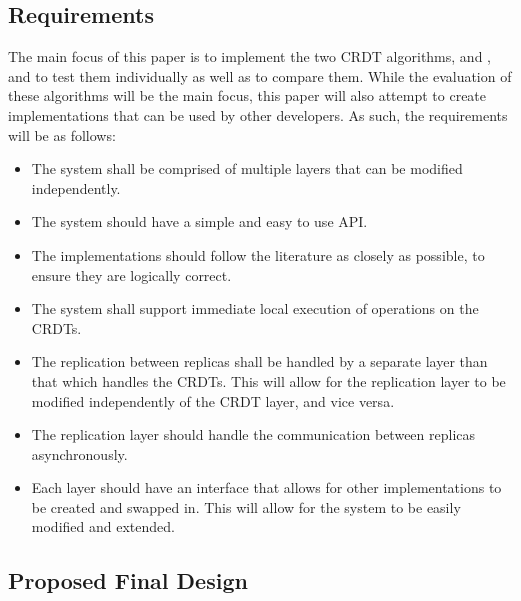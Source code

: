 \documentclass[12pt]{article}
\begin{document}
\subsection{Requirements}
The main focus of this paper is to implement the two CRDT algorithms, \cite{9563274} and \cite{https://doi.org/10.48550/arxiv.2103.04828}, and to test them individually as well as to compare them. While the evaluation of these algorithms will be the main focus, this paper will also attempt to create implementations that can be used by other developers. As such, the requirements will be as follows:
\begin{itemize}
    \item The system shall be comprised of multiple layers that can be modified independently.
    \item The system should have a simple and easy to use API.
    \item The implementations should follow the literature as closely as possible, to ensure they are logically correct.
    \item The system shall support immediate local execution of operations on the CRDTs.
    \item The replication between replicas shall be handled by a separate layer than that which handles the CRDTs. This will allow for the replication layer to be modified independently of the CRDT layer, and vice versa.
    \item The replication layer should handle the communication between replicas asynchronously.
    \item Each layer should have an interface that allows for other implementations to be created and swapped in. This will allow for the system to be easily modified and extended.
\end{itemize}

\subsection{Proposed Final Design}
\end{document}
